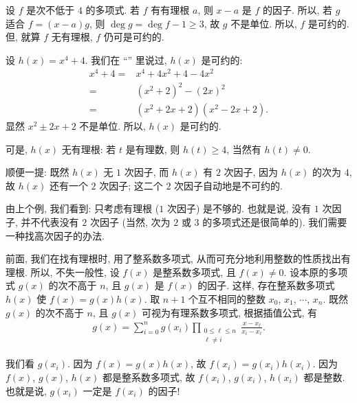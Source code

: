 设 $f$ 是次不低于 $4$ 的多项式. 若 $f$ 有有理根 $a$, 则 $x-a$ 是 $f$ 的因子. 所以, 若 $g$ 适合 $f = (x-a)g$, 则 $\deg g = \deg f - 1 \geq 3$, 故 $g$ 不是单位. 所以, $f$ 是可约的. 但, 就算 $f$ 无有理根, $f$ 仍可是可约的.

\begin{example}
    设 $h(x) = x^4 + 4$. 我们在 ``\PolynomialsOverZAndOverQ '' 里说过, $h(x)$ 是可约的:
    \begin{align*}
        x^4 + 4
        = {} & x^4 + 4x^2 + 4 - 4x^2          \\
        = {} & (x^2 + 2)^2 - (2x)^2           \\
        = {} & (x^2 + 2x + 2) (x^2 - 2x + 2).
    \end{align*}
    显然 $x^2 \pm 2x + 2$ 不是单位. 所以, $h(x)$ 是可约的.

    可是, $h(x)$ 无有理根: 若 $t$ 是有理数, 则 $h(t) \geq 4$, 当然有 $h(t) \neq 0$.

    顺便一提: 既然 $h(x)$ 无 $1$ 次因子, 而 $h(x)$ 有 $2$ 次因子, 因为 $h(x)$ 的次为 $4$, 故 $h(x)$ 还有一个 $2$ 次因子; 这二个 $2$ 次因子自动地是不可约的.
\end{example}

由上个例, 我们看到: 只考虑有理根 ($1$ 次因子) 是不够的. 也就是说, 没有 $1$ 次因子, 并不代表没有 $2$ 次因子 (当然, 次为 $2$ 或 $3$ 的多项式还是很简单的). 我们需要一种找高次因子的办法.

前面, 我们在找有理根时, 用了整系数多项式, 从而可充分地利用整数的性质找出有理根. 所以, 不失一般性, 设 $f(x)$ 是整系数多项式, 且 $f(x) \neq 0$. 设本原的多项式 $g(x)$ 的次不高于 $n$, 且 $g(x)$ 是 $f(x)$ 的因子. 这样, 存在整系数多项式 $h(x)$ 使 $f(x) = g(x) h(x)$. 取 $n+1$ 个互不相同的整数 $x_0$, $x_1$, $\cdots$, $x_n$. 既然 $g(x)$ 的次不高于 $n$, 且 $g(x)$ 可视为有理系数多项式, 根据插值公式, 有
\begin{align*}
    g(x) = \sum_{i = 0}^{n} g(x_i) \prod_{\begin{smallmatrix}0 \leq \ell \leq n \\\ell \neq i\end{smallmatrix}} \frac{x - x_\ell}{x_i - x_\ell}. \tag*{(L)}
\end{align*}

我们看 $g(x_i)$. 因为 $f(x) = g(x) h(x)$, 故 $f(x_i) = g(x_i) h(x_i)$. 因为 $f(x)$, $g(x)$, $h(x)$ 都是整系数多项式, 故 $f(x_i)$, $g(x_i)$, $h(x_i)$ 都是整数. 也就是说, $g(x_i)$ 一定是 $f(x_i)$ 的因子!

